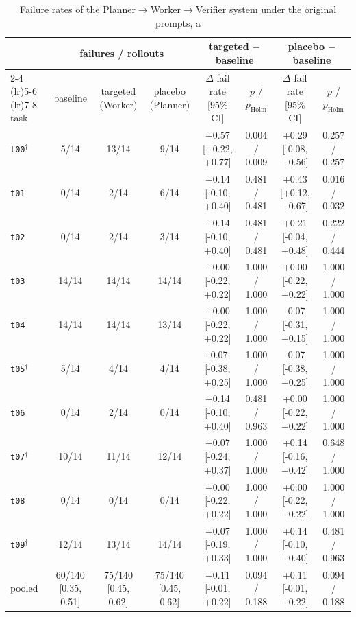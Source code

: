 \begin{table}[t]
\centering\scriptsize
\begin{tabular}{lccccccc}
\toprule
 & \multicolumn{3}{c}{failures / rollouts} & \multicolumn{2}{c}{targeted $-$ baseline} & \multicolumn{2}{c}{placebo $-$ baseline} \\
\cmidrule(lr){2-4} \cmidrule(lr){5-6} \cmidrule(lr){7-8}
task & baseline & targeted (Worker) & placebo (Planner) & $\Delta$ fail rate [95\% CI] & $p$ / $p_{\mathrm{Holm}}$ & $\Delta$ fail rate [95\% CI] & $p$ / $p_{\mathrm{Holm}}$ \\
\midrule
\texttt{t00}$^\dagger$ & 5/14 & 13/14 & 9/14 & +0.57 [+0.22, +0.77] & 0.004 / 0.009 & +0.29 [-0.08, +0.56] & 0.257 / 0.257 \\
\texttt{t01} & 0/14 & 2/14 & 6/14 & +0.14 [-0.10, +0.40] & 0.481 / 0.481 & +0.43 [+0.12, +0.67] & 0.016 / 0.032 \\
\texttt{t02} & 0/14 & 2/14 & 3/14 & +0.14 [-0.10, +0.40] & 0.481 / 0.481 & +0.21 [-0.04, +0.48] & 0.222 / 0.444 \\
\texttt{t03} & 14/14 & 14/14 & 14/14 & +0.00 [-0.22, +0.22] & 1.000 / 1.000 & +0.00 [-0.22, +0.22] & 1.000 / 1.000 \\
\texttt{t04} & 14/14 & 14/14 & 13/14 & +0.00 [-0.22, +0.22] & 1.000 / 1.000 & -0.07 [-0.31, +0.15] & 1.000 / 1.000 \\
\texttt{t05}$^\dagger$ & 5/14 & 4/14 & 4/14 & -0.07 [-0.38, +0.25] & 1.000 / 1.000 & -0.07 [-0.38, +0.25] & 1.000 / 1.000 \\
\texttt{t06} & 0/14 & 2/14 & 0/14 & +0.14 [-0.10, +0.40] & 0.481 / 0.963 & +0.00 [-0.22, +0.22] & 1.000 / 1.000 \\
\texttt{t07}$^\dagger$ & 10/14 & 11/14 & 12/14 & +0.07 [-0.24, +0.37] & 1.000 / 1.000 & +0.14 [-0.16, +0.42] & 0.648 / 1.000 \\
\texttt{t08} & 0/14 & 0/14 & 0/14 & +0.00 [-0.22, +0.22] & 1.000 / 1.000 & +0.00 [-0.22, +0.22] & 1.000 / 1.000 \\
\texttt{t09}$^\dagger$ & 12/14 & 13/14 & 14/14 & +0.07 [-0.19, +0.33] & 1.000 / 1.000 & +0.14 [-0.10, +0.40] & 0.481 / 0.963 \\
\midrule
pooled & 60/140 [0.35, 0.51] & 75/140 [0.45, 0.62] & 75/140 [0.45, 0.62] & +0.11 [-0.01, +0.22] & 0.094 / 0.188 & +0.11 [-0.01, +0.22] & 0.094 / 0.188 \\
\bottomrule
\end{tabular}
\caption{Failure rates of the Planner$\to$Worker$\to$Verifier system under the original prompts, a
}
\end{table}
